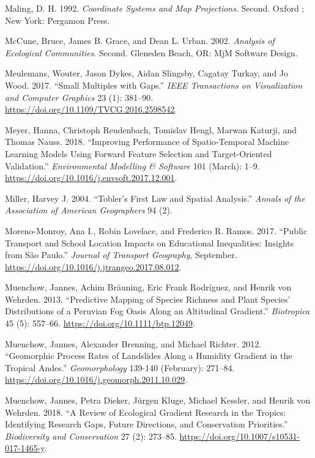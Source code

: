 \documentclass[]{krantz}
\begin{document}
\leavevmode\hypertarget{ref-maling_coordinate_1992}{}%
Maling, D. H. 1992. \emph{Coordinate Systems and Map Projections}. Second. Oxford ; New York: Pergamon Press.

\leavevmode\hypertarget{ref-mccune_analysis_2002}{}%
McCune, Bruce, James B. Grace, and Dean L. Urban. 2002. \emph{Analysis of Ecological Communities}. Second. Gleneden Beach, OR: MjM Software Design.

\leavevmode\hypertarget{ref-meulemans_small_2017}{}%
Meulemans, Wouter, Jason Dykes, Aidan Slingsby, Cagatay Turkay, and Jo Wood. 2017. ``Small Multiples with Gaps.'' \emph{IEEE Transactions on Visualization and Computer Graphics} 23 (1): 381--90. \url{https://doi.org/10.1109/TVCG.2016.2598542}.

\leavevmode\hypertarget{ref-meyer_improving_2018}{}%
Meyer, Hanna, Christoph Reudenbach, Tomislav Hengl, Marwan Katurji, and Thomas Nauss. 2018. ``Improving Performance of Spatio-Temporal Machine Learning Models Using Forward Feature Selection and Target-Oriented Validation.'' \emph{Environmental Modelling \& Software} 101 (March): 1--9. \url{https://doi.org/10.1016/j.envsoft.2017.12.001}.

\leavevmode\hypertarget{ref-miller_tobler_2004}{}%
Miller, Harvey J. 2004. ``Tobler's First Law and Spatial Analysis.'' \emph{Annals of the Association of American Geographers} 94 (2).

\leavevmode\hypertarget{ref-moreno-monroy_public_2017}{}%
Moreno-Monroy, Ana I., Robin Lovelace, and Frederico R. Ramos. 2017. ``Public Transport and School Location Impacts on Educational Inequalities: Insights from São Paulo.'' \emph{Journal of Transport Geography}, September. \url{https://doi.org/10.1016/j.jtrangeo.2017.08.012}.

\leavevmode\hypertarget{ref-muenchow_predictive_2013}{}%
Muenchow, Jannes, Achim Bräuning, Eric Frank Rodríguez, and Henrik von Wehrden. 2013. ``Predictive Mapping of Species Richness and Plant Species' Distributions of a Peruvian Fog Oasis Along an Altitudinal Gradient.'' \emph{Biotropica} 45 (5): 557--66. \url{https://doi.org/10.1111/btp.12049}.

\leavevmode\hypertarget{ref-muenchow_geomorphic_2012}{}%
Muenchow, Jannes, Alexander Brenning, and Michael Richter. 2012. ``Geomorphic Process Rates of Landslides Along a Humidity Gradient in the Tropical Andes.'' \emph{Geomorphology} 139-140 (February): 271--84. \url{https://doi.org/10.1016/j.geomorph.2011.10.029}.

\leavevmode\hypertarget{ref-muenchow_review_2018}{}%
Muenchow, Jannes, Petra Dieker, Jürgen Kluge, Michael Kessler, and Henrik von Wehrden. 2018. ``A Review of Ecological Gradient Research in the Tropics: Identifying Research Gaps, Future Directions, and Conservation Priorities.'' \emph{Biodiversity and Conservation} 27 (2): 273--85. \url{https://doi.org/10.1007/s10531-017-1465-y}.
\end{document}
